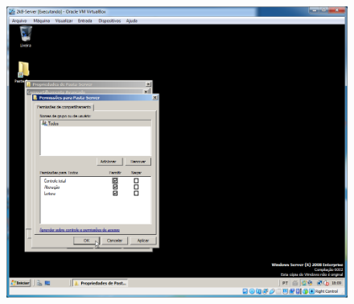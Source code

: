 \documentclass[10pt]{article}
\begin{document}
\begin{figure}[H]
    \centering
    \caption{}
    \label{fig:51111}
    \includegraphics[width=\linewidth]{images/windows_server/compartilhamento/015.png}
\end{figure}
\end{document}
